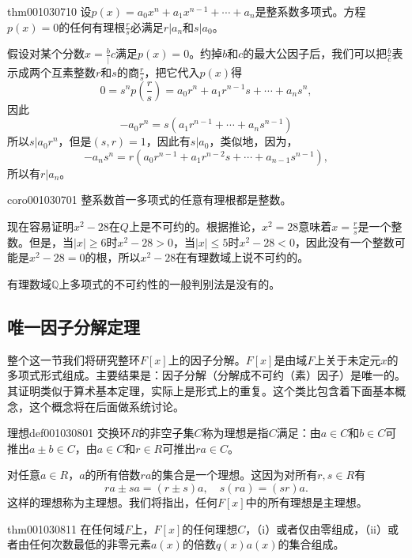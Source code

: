 \begin{theorem}{}{thm001030710}
设$p(x)=a_0x^n+a_1x^{n-1}+\cdots+a_n$是整系数多项式。方程$p(x)=0$的任何有理根$\frac{r}{s}$必满足$r|a_n$和$s|a_0$。
\end{theorem}

假设对某个分数$x=\frac{b}|{c}$满足$p(x)=0$。约掉$b$和$c$的最大公因子后，我们可以把$\frac{b}{c}$表示成两个互素整数$r$和$s$的商$\frac{r}{s}$，把它代入$p(x)$得
\begin{equation}\label{equ001030712}
0 = s^np(\frac{r}{s}) = a_0r^n + a_1r^{n-1}s+\cdots+a_ns^n,
\end{equation}
因此
\[
-a_0r^n = s(a_1r^{n-1}+\cdots+a_ns^{n-1})
\]
所以$s|a_0r^n$，但是$(s, r)=1$，因此有$s|a_0$，类似地，因为，
\[
-a_ns^n = r(a_0r^{n-1} + a_1r^{n-2}s+\cdots+a_{n-1}s^{n-1}),
\]
所以有$r|a_n$。

\begin{corollary}{}{coro001030701}
整系数首一多项式的任意有理根都是整数。
\end{corollary}

现在容易证明$x^2-28$在$Q$上是不可约的。根据推论，$x^2=28$意味着$x = \frac{r}{s}$是一个整数。但是，当$|x| \ge 6$时$x^2-28>0$，当$|x| \le 5$时$x^2-28<0$，因此没有一个整数可能是$x^2-28=0$的根，所以$x^2-28$在有理数域上说不可约的。

有理数域$\mathbb{Q}$上多项式的不可约性的一般判别法是没有的。


\subsection{唯一因子分解定理}\label{subsection0010308}
整个这一节我们将研究整环$F[x]$上的因子分解。$F[x]$是由域$F$上关于未定元$x$的多项式形式组成。主要结果是：因子分解（分解成不可约（素）因子）是唯一的。其证明类似于算术基本定理，实际上是形式上的重复。这个类比包含着下面基本概念，这个概念将在后面做系统讨论。

\begin{definition}{理想}{def001030801}
交换环$R$的非空子集$C$称为理想是指$C$满足：由$a \in C$和$b \in C$可推出$a \pm b \in C$，由$a \in C$和$r \in R$可推出$ra \in C$。
\end{definition}

对任意$a \in R$，$a$的所有倍数$ra$的集合是一个理想。这因为对所有$r, s \in R$有
\[
ra \pm sa = (r \pm s)a, \quad s(ra) = (sr)a.
\]
这样的理想称为主理想。我们将指出，任何$F[x]$中的所有理想是主理想。
\begin{theorem}{}{thm001030811}
在任何域$F$上，$F[x]$的任何理想$C$，（i）或者仅由零组成，（ii）或者由任何次数最低的非零元素$a(x)$的倍数$q(x)a(x)$的集合组成。
\end{theorem}

